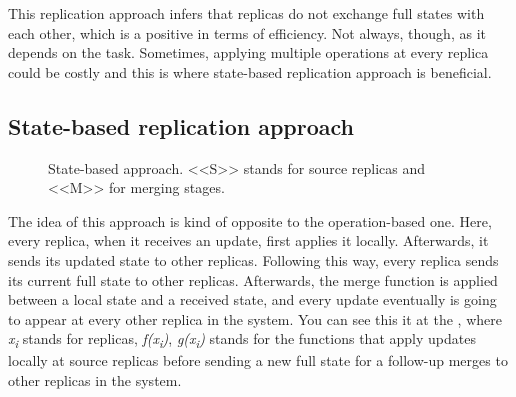 This replication approach infers that replicas do not exchange full states with each other, which is a positive in terms of efficiency. Not always, though, as it depends on the task. Sometimes, applying multiple operations at every replica could be costly and this is where state-based replication approach is beneficial.


\subsection*{State-based replication approach}
\begin{figure}[!htb]
    \begin{center}
    \def\svgwidth{\linewidth}
    
    \caption {State-based approach\cite{2}. <<S>> stands for source replicas and <<M>> for merging stages.}
    \label{fig:theory2}
\end{center}
\end{figure}

The idea of this approach is kind of opposite to the operation-based one. Here, every replica, when it receives an update, first applies it locally. Afterwards, it sends its updated state to other replicas. Following this way, every replica sends its current full state to other replicas. Afterwards, the merge function is applied between a local state and a received state, and every update eventually is going to appear at every other replica in the system. You can see this it at the , where \textit{x\textsubscript{i}} stands for replicas, \textit{f(x\textsubscript{i})}, \textit{g(x\textsubscript{i})} stands for the functions that apply updates locally at source replicas before sending a new full state for a follow-up merges to other replicas in the system.

